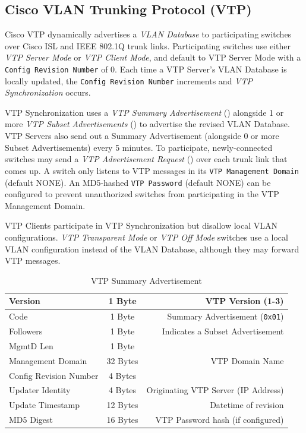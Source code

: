 \documentclass[12pt]{article}
\begin{document}
	\subsection[Cisco VTP]{Cisco VLAN Trunking Protocol (VTP) \label{subsec:CISCO VTP}}
	Cisco VTP dynamically advertises a \textit{VLAN Database} to participating switches over Cisco ISL and IEEE 802.1Q trunk links. Participating switches use either \textit{VTP Server Mode} or \textit{VTP Client Mode}, and default to VTP Server Mode with a \texttt{Config Revision Number} of 0. Each time a VTP Server's VLAN Database is locally updated, the \texttt{Config Revision Number} increments and \textit{VTP Synchronization} occurs.

	VTP Synchronization uses a \textit{VTP Summary Advertisement} () alongside 1 or more \textit{VTP Subset Advertisements} () to advertise the revised VLAN Database. VTP Servers also send out a Summary Advertisement (alongside 0 or more Subset Advertisements) every 5 minutes. To participate, newly-connected switches may send a \textit{VTP Advertisement Request} () over each trunk link that comes up. A switch only listens to VTP messages in its \texttt{VTP Management Domain} (default NONE). An MD5-hashed \texttt{VTP Password} (default NONE) can be configured to prevent unauthorized switches from participating in the VTP Management Domain.

	VTP Clients participate in VTP Synchronization but disallow local VLAN configurations. \textit{VTP Transparent Mode} or \textit{VTP Off Mode} switches use a local VLAN configuration instead of the VLAN Database, although they may forward VTP messages.

	\begin{table}[H]
	\centering
	\caption{VTP Summary Advertisement \label{tab:VTP SUMMARY}}
	\begin{tabular}{| l | c | r |}
	\hline
	Version				& 1 Byte	& VTP Version (1-3)\\\hline
	Code					& 1 Byte	& Summary Advertisement (\texttt{0x01})\\\hline
	Followers				& 1 Byte	& Indicates a Subset Advertisement\\\hline
	MgmtD Len				& 1 Byte	&\\\hline
	Management Domain		& 32 Bytes	& VTP Domain Name\\\hline
	Config Revision Number	& 4 Bytes	&\\\hline
	Updater Identity			& 4 Bytes	& Originating VTP Server (IP Address)\\\hline
	Update Timestamp		& 12 Bytes	& Datetime of revision\\\hline
	MD5 Digest				& 16 Bytes	& VTP Password hash (if configured)\\\hline
	\end{tabular}\end{table}
\end{document}
